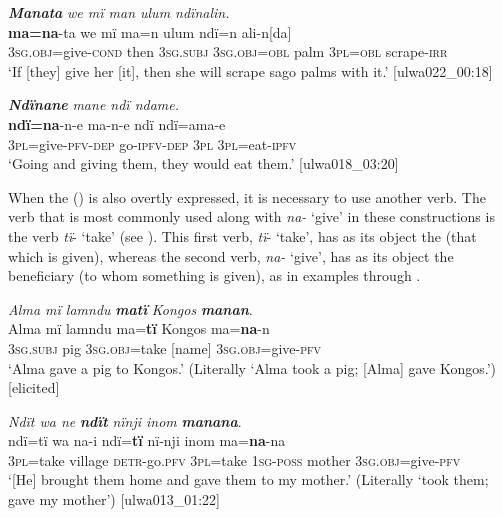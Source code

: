 \ea%
    \label{ex:clause:31}
          \textbf{\textit{Manata}} \textit{we mï man ulum ndïnalin.}\\
\gll    \textbf{ma=na}{}-ta        we    mï      ma=n      ulum     ndï=n    ali-n[da]\\
    3\textsc{sg.obj}=give-\textsc{cond}  then  \textsc{3sg.subj}  \textsc{3sg.obj=obl}  palm    3\textsc{pl=obl}  scrape-\textsc{irr}\\
\glt `If [they] give her [it], then she will scrape sago palms with it.’ [ulwa022\_00:18]
\z

\ea%
    \label{ex:clause:32}
          \textbf{\textit{Ndïnane}} \textit{mane ndï ndame.}\\
\gll    \textbf{ndï=na}{}-n-e    ma-n-e      ndï  ndï=ama-e\\
    3\textsc{pl}=give-\textsc{pfv-dep}  go-\textsc{ipfv-dep}  \textsc{3pl}  \textsc{3pl=}eat-\textsc{ipfv}\\
\glt `Going and giving them, they would eat them.’ [ulwa018\_03:20]
\z

When the  () is also overtly expressed, it is necessary to use another verb. The verb that is most commonly used along with \textit{na-} ‘give’ in these constructions is the verb \textit{tï}- ‘take’ (see ). This first verb, \textit{tï}- ‘take’, has as its object the  (that which is given), whereas the second verb, \textit{na-} ‘give’, has as its object the beneficiary (to whom something is given), as in examples  through .

\ea%
    \label{ex:clause:33}
          \textit{Alma mï lamndu} \textbf{\textit{matï}} \textit{Kongos} \textbf{\textit{manan}}.\\
\gll Alma  mï      lamndu  ma=\textbf{tï}      Kongos     ma=\textbf{na}{}-n\\
    [name]  3\textsc{sg.subj}  pig      3\textsc{sg.obj}=take  [name]    3\textsc{sg.obj}=give-\textsc{pfv}\\
\glt `Alma gave a pig to Kongos.’ (Literally ‘Alma took a pig; [Alma] gave Kongos.’) [elicited]
\z

\ea%
    \label{ex:clause:34}
          \textit{Ndït wa ne} \textbf{\textit{ndït}} \textit{nïnji inom} \textbf{\textit{manana}}.\\
\gll ndï=tï    wa    na-i      ndï=\textbf{tï}    nï-nji     inom     ma=\textbf{na}{}-na\\
    3\textsc{pl}=take  village  \textsc{detr-}go.\textsc{pfv}  \textsc{3pl}=take  1\textsc{sg-poss}  mother    3\textsc{sg.obj}=give-\textsc{pfv}\\
\glt `[He] brought them home and gave them to my mother.’ (Literally ‘took them; gave my mother’) [ulwa013\_01:22]
\z

